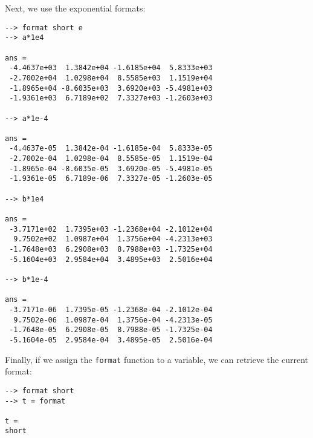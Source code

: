 Next, we use the exponential formats:
\begin{verbatim}
--> format short e
--> a*1e4

ans = 
 -4.4637e+03  1.3842e+04 -1.6185e+04  5.8333e+03 
 -2.7002e+04  1.0298e+04  8.5585e+03  1.1519e+04 
 -1.8965e+04 -8.6035e+03  3.6920e+03 -5.4981e+03 
 -1.9361e+03  6.7189e+02  7.3327e+03 -1.2603e+03 

--> a*1e-4

ans = 
 -4.4637e-05  1.3842e-04 -1.6185e-04  5.8333e-05 
 -2.7002e-04  1.0298e-04  8.5585e-05  1.1519e-04 
 -1.8965e-04 -8.6035e-05  3.6920e-05 -5.4981e-05 
 -1.9361e-05  6.7189e-06  7.3327e-05 -1.2603e-05 

--> b*1e4

ans = 
 -3.7171e+02  1.7395e+03 -1.2368e+04 -2.1012e+04 
  9.7502e+02  1.0987e+04  1.3756e+04 -4.2313e+03 
 -1.7648e+03  6.2908e+03  8.7988e+03 -1.7325e+04 
 -5.1604e+03  2.9584e+04  3.4895e+03  2.5016e+04 

--> b*1e-4

ans = 
 -3.7171e-06  1.7395e-05 -1.2368e-04 -2.1012e-04 
  9.7502e-06  1.0987e-04  1.3756e-04 -4.2313e-05 
 -1.7648e-05  6.2908e-05  8.7988e-05 -1.7325e-04 
 -5.1604e-05  2.9584e-04  3.4895e-05  2.5016e-04 
\end{verbatim}
Finally, if we assign the \verb|format| function to a variable, we can retrieve the 
current format:
\begin{verbatim}
--> format short
--> t = format

t = 
short
\end{verbatim}
